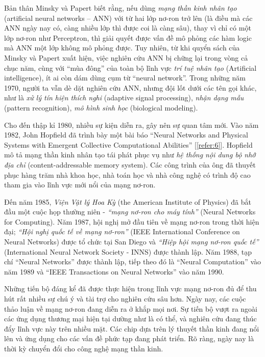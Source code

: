Bản thân Minsky và Papert biết rằng, nếu dùng \textit{mạng thần kinh nhân tạo} (artificial neural networks – ANN) với từ hai lớp nơ-ron trở lên (là điều mà các ANN ngày nay có, càng nhiều lớp thì được coi là càng sâu), thay vì chỉ có một lớp nơ-ron như Perceptron, thì giải quyết được vấn đề mô phỏng các hàm logic mà ANN một lớp không mô phỏng được. Tuy nhiên, từ khi quyển sách của Minsky và Papert xuất hiện, việc nghiên cứu ANN bị chững lại trong vòng cả chục năm, cùng với ``mùa đông'' của toàn bộ lĩnh vực \textit{trí tuệ nhân tạo} (Artificial intelligence), ít ai còn dám dùng cụm từ “neural network”. Trong những năm 1970, người ta vẫn dè dặt nghiên cứu ANN, nhưng đội lốt dưới các tên gọi khác, như là \textit{xử lý tín hiện thích nghi} (adaptive signal processing), \textit{nhận dạng
mẫu} (pattern recognition), \textit{mô hình sinh học} (biological modeling).

Cho đến thập kỉ 1980, nhiều sự kiện diễn ra, gây nên sự quan tâm mới.
Vào năm 1982, John Hopfield đã trình bày một bài báo ``Neural Networks and Physical Systems with Emergent Collective Computational Abilities'' [\ref{refer:6}]. Hopfield mô tả mạng thần kinh nhân tạo tái phát phục vụ như \textit{hệ thống nội dung bộ nhớ địa chỉ} (content-addressable memory system). Các công trình của ông đã thuyết phục hàng trăm nhà khoa học, nhà toán học và nhà công nghệ có trình độ cao tham gia vào lĩnh vực mới nổi của mạng nơ-ron.

Đến năm 1985, \textit{Viện Vật lý Hoa Kỳ} (the American Institute of Physics) đã bắt đầu một cuộc họp thường niên - \textit{``mạng nơ-ron cho máy tính''} (Neural Networks for Computing). Năm 1987, hội nghị mở đầu tiên về mạng nơ-ron trong thời hiện đại; \textit{``Hội nghị quốc tế về mạng nơ-ron''} (IEEE International Conference on Neural Networks) được tổ chức tại San Diego và \textit{``Hiệp hội mạng nơ-ron quốc tế''} (International Neural Network Society - INNS) được thành lập. Năm 1988, tạp chí ``Neural Networks'' được thành lập, tiếp theo đó là ``Neural Computation'' vào năm 1989 và ``IEEE Transactions on Neural Networks'' vào năm 1990.

Những tiến bộ đáng kể đã được thực hiện trong lĩnh vực mạng nơ-ron đủ để thu hút rất nhiều sự chú ý và tài trợ cho nghiên cứu sâu hơn. Ngày nay, các cuộc thảo luận về mạng nơ-ron đang diễn ra ở khắp mọi nơi. Sự tiến bộ vượt ra ngoài các ứng dụng thương mại hiện tại dường như là có thể, và nghiên cứu đang thúc đẩy lĩnh vực này trên nhiều mặt. Các chip dựa trên lý thuyết thần kinh đang nổi lên và ứng dụng cho các vấn đề phức tạp đang phát triển. Rõ ràng, ngày nay là thời kỳ chuyển đổi cho công nghệ mạng thần kinh.

